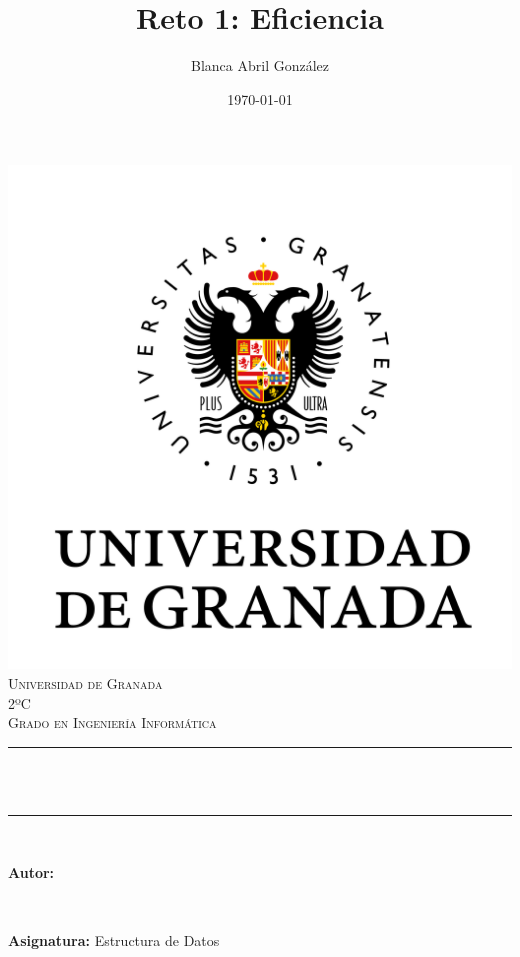 \documentclass[12pt, spanish]{article}
\title{Reto 1: Eficiencia}
\author{Blanca Abril González}
\date{\today}
\makeatletter
\let\thetitle\@title
\let\theauthor\@author
\makeatother
\begin{document}
\begin{titlepage}
    \centering
    \vspace*{0.5 cm}
   	\includegraphics[scale = 0.5]{UGR.png}\\[1.0 cm]
    \textsc{\LARGE Universidad de Granada}\\[2.0 cm]   
    \textsc{\large 2ºC}\\[0.5 cm]            
    \textsc{\large Grado en Ingeniería Informática}\\[0.5 cm]              
    \rule{\linewidth}{0.2 mm} \\[0.4 cm]
    { \huge \bfseries \thetitle}\\
    \rule{\linewidth}{0.2 mm} \\[1.5 cm]
    
    \begin{minipage}{0.4\textwidth}
        \begin{flushleft} \large
            \textbf{Autor:}
            \theauthor
            \end{flushleft}
            \end{minipage}~
            \begin{minipage}{0.5\textwidth}
            \begin{flushright} \large
            \textbf{Asignatura: }{
            Estructura de Datos}                   
        \end{flushright}
    \end{minipage}\\[1 cm]
  	
    \vfill
    
\end{titlepage}
\end{document}
